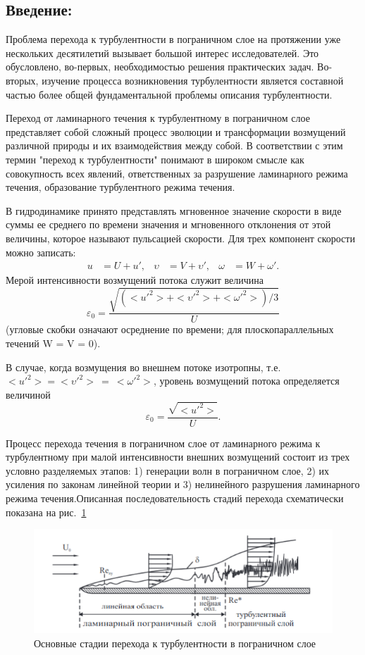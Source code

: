 \documentclass[12pt,a4paper]{article}
\begin{document}
\subsection*{Введение:}
\par Проблема перехода к турбулентности в пограничном слое на протяжении уже нескольких десятилетий вызывает большой интерес исследователей.  Это обусловлено, во-первых, необходимостью решения практических задач. Во-вторых, изучение процесса возникновения турбулентности является составной частью более общей фундаментальной проблемы описания турбулентности. 
\par Переход от ламинарного течения к турбулентному в пограничном слое представляет собой сложный процесс эволюции и трансформации возмущений различной природы и их взаимодействия между собой. В соответствии с этим термин "переход к турбулентности" понимают в широком смысле как совокупность всех явлений, ответственных за разрушение ламинарного режима течения, образование турбулентного режима течения. 
\par В гидродинамике принято представлять мгновенное значение скорости в виде суммы ее среднего по времени значения и мгновенного отклонения от этой величины, которое называют пульсацией скорости. Для трех компонент скорости можно записать:
\begin{align*}
    u &= U + u', & \upsilon &= V + \upsilon', & \omega &= W + \omega'.
\end{align*}
Мерой интенсивности возмущений потока служит величина
\begin{equation*}
    \varepsilon_0 = \frac{\sqrt{(<u'^2> + <\upsilon'^2> + <\omega'^2>)/3}}{U}
\end{equation*}
(угловые скобки означают осреднение по времени; для плоскопараллельных течений W = V = 0).
\par В случае, когда возмущения во внешнем потоке изотропны, т.е. $<u'^2> = <\upsilon'^2> ~= ~<\omega'^2>$, уровень возмущений потока определяется величиной
\begin{equation*}
    \varepsilon_0 = \frac{\sqrt{<u'^2>}}{U}.
\end{equation*}
\par Процесс перехода течения в пограничном слое от ламинарного режима к турбулентному при малой интенсивности внешних возмущений состоит из трех условно разделяемых этапов: 1) генерации волн в пограничном слое, 2) их усиления по законам линейной теории и 3) нелинейного разрушения ламинарного режима течения.Описанная последовательность стадий перехода схематически показана на рис.~\ref{1}
\newpage
\begin{figure}[h!]
    \centering
    \includegraphics[width = 0.8 \textwidth]{lam_to_turbo.png}
    \caption{Основные стадии перехода к турбулентности в пограничном слое}
    \label{1}
\end{figure}
\end{document}

